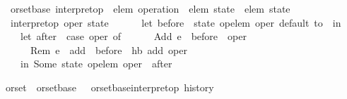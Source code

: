 \begin{isabellebody}
\isamarkupfalse%
\ {\isacharparenleft}\ orset{\isacharunderscore}base{\isacharparenright}\ interpret{\isacharunderscore}op\ {\isacharcolon}{\isacharcolon}\ {\isachardoublequoteopen}{\isacharprime}elem\ operation\ {\isasymRightarrow}\ {\isacharprime}elem\ state\ {\isasymrightharpoonup}\ {\isacharprime}elem\ state{\isachardoublequoteclose}\ {\isacharparenleft}{\isachardoublequoteopen}{\isasymlangle}{\isacharunderscore}{\isasymrangle}{\isachardoublequoteclose}\ {\isacharbrackleft}{}{\isacharbrackright}\ {}{}{}{}{\isacharparenright}\ \isanewline
\ \ {\isachardoublequoteopen}interpret{\isacharunderscore}op\ oper\ state\ {\isacharequal}\ {\isacharparenleft}\isanewline
\ \ \ \ let\ before\ {\isacharequal}\ {\isacharparenleft}state\ {\isacharparenleft}op{\isacharunderscore}elem\ oper{\isacharparenright}{\isacharparenright}\ default\ to\ {\isacharbraceleft}{\isacharbraceright}\ in\isanewline
\ \ \ \ let\ after\ {\isacharequal}\ case\ oper\ of\isanewline
\ \ \ \ \ \ Add\ e\ {\isasymRightarrow}\ before\ {\isasymunion}\ {\isacharbraceleft}oper{\isacharbraceright}\ {\isacharbar}\isanewline
\ \ \ \ \ \ Rem\ e\ {\isasymRightarrow}\ {\isacharbraceleft}add\ {\isasymin}\ before{\isachardot}\ {\isasymnot}\ hb\ add\ oper{\isacharbraceright}\isanewline
\ \ \ \ in\ Some\ {\isacharparenleft}state\ {\isacharparenleft}{\isacharparenleft}op{\isacharunderscore}elem\ oper{\isacharparenright}\ {\isasymmapsto}\ after{\isacharparenright}{\isacharparenright}{\isacharparenright}{\isachardoublequoteclose}\isanewline
\end{isabellebody}

\begin{isabellebody}
\isamarkupfalse%
\ orset\ {\isacharequal}\ orset{\isacharunderscore}base\ {\isacharunderscore}\ {\isacharunderscore}\ {\isachardoublequoteopen}orset{\isacharunderscore}base{\isachardot}interpret{\isacharunderscore}op\ history{\isachardoublequoteclose}\isanewline
\end{isabellebody}

